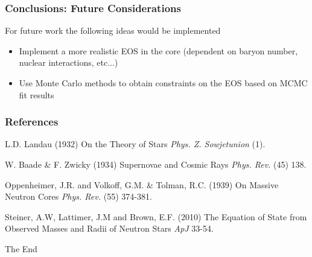 \documentclass{beamer}
\begin{document}
\begin{frame}
\frametitle{Conclusions: Future Considerations}
For future work the following ideas would be implemented
\begin{itemize}
\item Implement a more realistic EOS in the core (dependent on baryon number, nuclear interactions, etc...)
\item Use Monte Carlo methods to obtain constraints on the EOS based on MCMC fit results
\end{itemize}
\end{frame}
\begin{frame}
\frametitle{References}
\footnotesize{
\begin{thebibliography}{99} %
 L.D. Landau (1932)
\newblock On the Theory of Stars
\newblock \emph{Phys. Z. Sowjetunion} (1).

 W. Baade \& F. Zwicky (1934)
\newblock Supernovae and Cosmic Rays
\newblock \emph{Phys. Rev.} (45) 138.

 Oppenheimer, J.R. and Volkoff, G.M. \& Tolman, R.C. (1939)
\newblock On Massive Neutron Cores
\newblock \emph{Phys. Rev.} (55) 374-381.

 Steiner, A.W, Lattimer, J.M and Brown, E.F. (2010)
\newblock The Equation of State from Observed Masses and Radii of Neutron Stars
\newblock \emph{ApJ} 33-54.

\end{thebibliography}
}

\end{frame}


\begin{frame}
\Huge{\centerline{The End}}
\end{frame}

\end{document}
